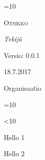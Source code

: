 \documentclass[oneside, 12pt,a4paper,finnish]{extarticle}
\date{}
\begin{document}
=10
\begin{titlepage}
	\centering
	\vspace*{5cm}
	{\scshape \Huge Otsikko\par}
	\vspace{2cm}
	{\Large\itshape Tekijä\par}
	\vfill
	Versio: 0.0.1 \par
	18.7.2017 \par
	\vfill
	{\large Organisaatio\par}
\end{titlepage}
\fi


\let\cleardoublepage\clearpage




=10
{
\setcounter{tocdepth}{3}
\tableofcontents
\newpage
\let\cleardoublepage\clearpage
}
\fi
 



<10
\pagestyle{myfancyfooter}
\makeatletter
\let\ps@plain\ps@fancy
\makeatother
\fi
{}


Hello 1

Hello 2
\end{document}

